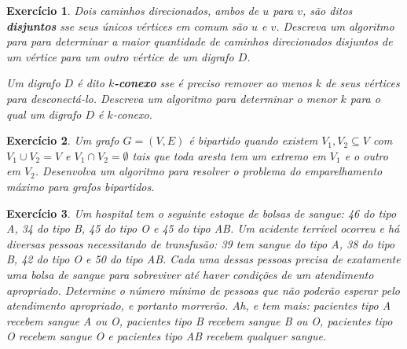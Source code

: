 \documentclass[]{article}
\newtheorem{exercicio}{Exercício}
\numberwithin{equation}{section}
\begin{document}
\begin{exercicio}
  Dois caminhos direcionados, ambos de $u$ para $v$, são ditos \textbf{disjuntos} sse seus únicos vértices em comum são $u$ e $v$. Descreva um algoritmo para para determinar a maior quantidade de caminhos direcionados disjuntos de um vértice para um outro vértice de um digrafo $D$.

  Um digrafo $D$ é dito \textbf{$k$-conexo} sse é preciso remover ao menos $k$ de seus vértices para desconectá-lo. Descreva um algoritmo para determinar o menor $k$ para o qual um digrafo $D$ é $k$-conexo.
\end{exercicio}

\begin{exercicio}
  Um grafo $G = (V, E)$ é bipartido quando existem $V_1, V_2 \subseteq V$ com
  $V_1 \cup V_2 = V$ e $V_1 \cap V_2 = \emptyset$ tais que toda aresta tem um extremo em $V_1$
  e o outro em $V_2$.
  Desenvolva um algoritmo para resolver o problema do emparelhamento máximo para grafos
  bipartidos.
\end{exercicio}

\begin{exercicio}
  Um hospital tem o seguinte estoque de bolsas de sangue: 46 do tipo A, 34 do tipo B, 45 do tipo O e 45 do tipo AB. Um acidente terrível ocorreu e há diversas pessoas necessitando de transfusão: 39 tem sangue do tipo A, 38 do tipo B, 42 do tipo O e 50 do tipo AB. Cada uma dessas pessoas precisa de exatamente uma bolsa de sangue para sobreviver até haver condições de um atendimento apropriado. Determine o número mínimo de pessoas que não poderão esperar pelo atendimento apropriado, e portanto morrerão. Ah, e tem mais: pacientes tipo A recebem sangue A ou O, pacientes tipo B recebem sangue B ou O, pacientes tipo O recebem sangue O e pacientes tipo AB recebem qualquer sangue.
\end{exercicio}
\end{document}
